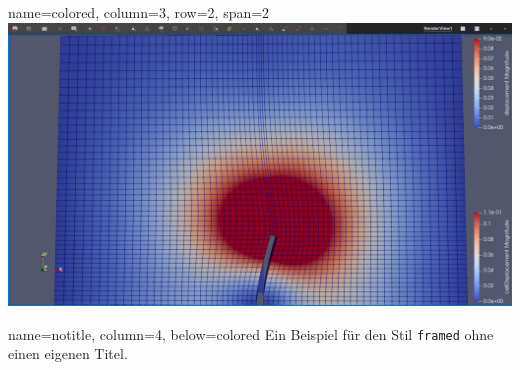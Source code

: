 \documentclass[
	paper=a0,%
	style=ruled, %
	]{bfhsciposter}
\let\code\texttt
\begin{document}
\begin{tcbposter}[
		poster={
				columns=4,
				rows=7,
				spacing=1cm,
			},]
	\begin{posterboxenv}[title=A BFH-colored style box, BFH-colored]{name=colored, column=3, row=2, span=2}
		\includegraphics[width=\linewidth]{sequence2}
	\end{posterboxenv}

	\begin{posterboxenv}{name=notitle, column=4, below=colored}
		Ein Beispiel für den Stil \code{framed} ohne einen eigenen Titel.
	\end{posterboxenv}





\end{tcbposter}
\end{document}
